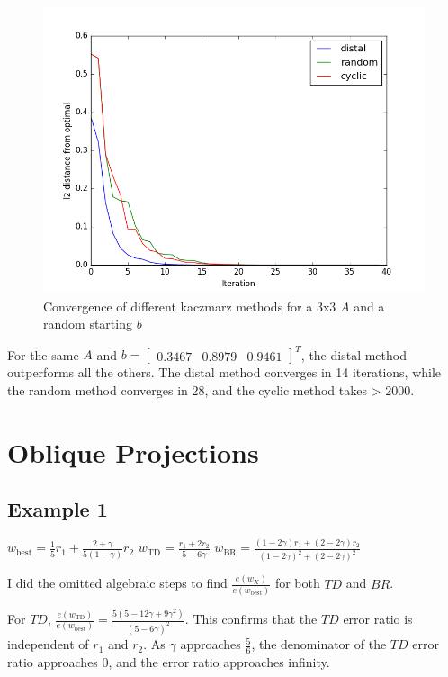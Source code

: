 \documentclass{article}
\begin{document}
  \begin{figure}[!ht]
    \centering
    \includegraphics[width=\textwidth,keepaspectratio=true]{kaczmarz.png}
    \caption{Convergence of different kaczmarz methods for a 3x3 $A$ and a random starting $b$}
    \label{fig:kaczmarz}
\end{figure}

For the same $A$ and $b = \begin{bmatrix}0.3467 & 0.8979 & 0.9461\end{bmatrix}^T$, the distal method outperforms all the others. The distal method converges in 14 iterations, while the random method converges in 28, and the cyclic method takes > 2000.

\section{Oblique Projections}

\subsection{Example 1}

$w_{\text{best}} = \frac{1}{5}r_1 + \frac{2+\gamma}{5(1-\gamma)}r_2$
$w_{\text{TD}} = \frac{r_1+2r_2}{5-6\gamma}$
$w_{\text{BR}} = \frac{(1-2\gamma)r_1+(2-2\gamma)r_2}{(1-2\gamma)^2+(2-2\gamma)^2}$

I did the omitted algebraic steps to find $\frac{e(w_X)}{e(w_{\text{best}})}$ for both $TD$ and $BR$.

For $TD$, $\frac{e(w_{\text{TD}})}{e(w_{\text{best}})} = \frac{5(5-12\gamma + 9\gamma^2)}{(5 - 6 \gamma)^2}$. This confirms that the $TD$ error ratio is independent of $r_1$ and $r_2$. As $\gamma$ approaches $\frac{5}{6}$, the denominator of the $TD$ error ratio approaches 0, and the error ratio approaches infinity.
\end{document}
